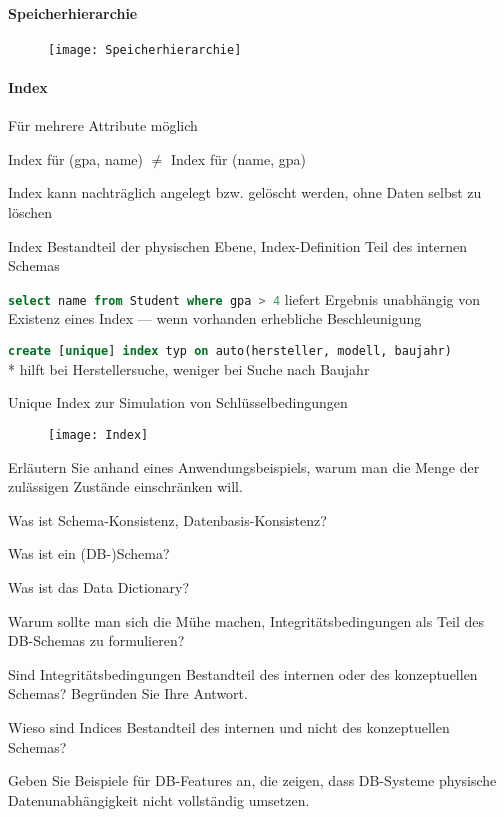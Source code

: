\paragraph{Speicherhierarchie}
\begin{figure}[H]\centering\label{Speicherhierarchie}\texttt{[image: Speicherhierarchie]}\end{figure}

\paragraph{Index}
\begin{items}
	\item Für mehrere Attribute möglich
	\item Index für (gpa, name) \( \neq \) Index für (name, gpa)
	\item Index kann nachträglich angelegt bzw. gelöscht werden, ohne Daten selbst zu löschen
	\item Index Bestandteil der physischen Ebene, Index-Definition Teil des internen Schemas
	\item \lstinline[language=sql]{select name from Student where gpa > 4} liefert Ergebnis unabhängig von Existenz eines Index --- wenn vorhanden erhebliche Beschleunigung
	\item \lstinline[language=sql]{create [unique] index typ on auto(hersteller, modell, baujahr)} \\* hilft bei Herstellersuche, weniger bei Suche nach Baujahr
	\item Unique Index zur Simulation von Schlüsselbedingungen
\end{items}
\begin{figure}[H]\centering\label{Index}\texttt{[image: Index]}\end{figure}

\begin{fragen}
	\item Erläutern Sie anhand eines Anwendungsbeispiels, warum man die Menge der zulässigen Zustände einschränken will.
	\item Was ist Schema-Konsistenz, Datenbasis-Konsistenz?
	\item Was ist ein (DB-)Schema?
	\item Was ist das Data Dictionary?
	\item Warum sollte man sich die Mühe machen, Integritätsbedingungen als Teil des DB-Schemas zu formulieren?
	\item Sind Integritätsbedingungen Bestandteil des internen oder des konzeptuellen Schemas? Begründen Sie Ihre Antwort.
	\item Wieso sind Indices Bestandteil des internen und nicht des konzeptuellen Schemas?
	\item Geben Sie Beispiele für DB-Features an, die zeigen, dass DB-Systeme physische Datenunabhängigkeit nicht vollständig umsetzen.
\end{fragen}